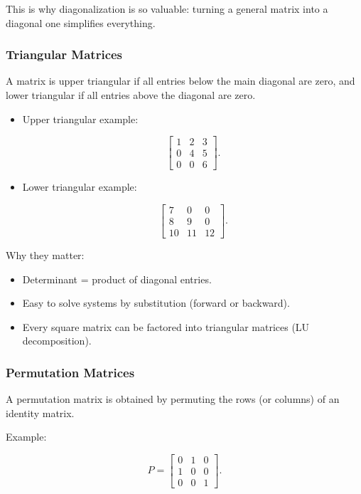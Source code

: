 \documentclass[
  letterpaper,
  DIV=11,
  numbers=noendperiod]{scrreprt}
\providecommand{\tightlist}{%
  \setlength{\itemsep}{0pt}\setlength{\parskip}{0pt}}
\begin{document}
This is why diagonalization is so valuable: turning a general matrix
into a diagonal one simplifies everything.

\subsubsection{Triangular Matrices}\label{triangular-matrices}

A matrix is upper triangular if all entries below the main diagonal are
zero, and lower triangular if all entries above the diagonal are zero.

\begin{itemize}
\item
  Upper triangular example:

  \[
  \begin{bmatrix} 
  1 & 2 & 3 \\ 
  0 & 4 & 5 \\ 
  0 & 0 & 6 
  \end{bmatrix}.
  \]
\item
  Lower triangular example:

  \[
  \begin{bmatrix} 
  7 & 0 & 0 \\ 
  8 & 9 & 0 \\ 
  10 & 11 & 12 
  \end{bmatrix}.
  \]
\end{itemize}

Why they matter:

\begin{itemize}
\tightlist
\item
  Determinant = product of diagonal entries.
\item
  Easy to solve systems by substitution (forward or backward).
\item
  Every square matrix can be factored into triangular matrices (LU
  decomposition).
\end{itemize}

\subsubsection{Permutation Matrices}\label{permutation-matrices}

A permutation matrix is obtained by permuting the rows (or columns) of
an identity matrix.

Example:

\[
P = \begin{bmatrix} 
0 & 1 & 0 \\ 
1 & 0 & 0 \\ 
0 & 0 & 1 
\end{bmatrix}.
\]
\end{document}
